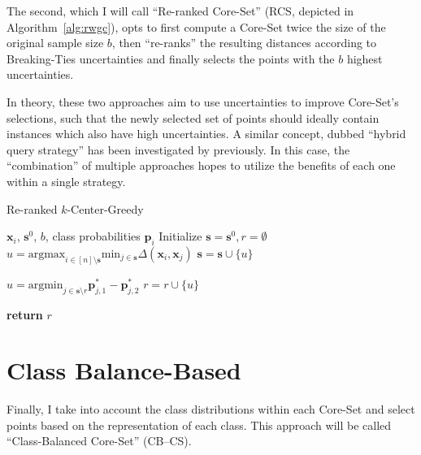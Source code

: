 \documentclass[english,bachelor,ul]{webisthesis} %
\begin{document}
The second, which I will call ``Re-ranked Core-Set'' (RCS, depicted in Algorithm~\ref{alg:rwgc}), opts to first compute a Core-Set twice the size of the original sample size $b$, then ``re-ranks'' the resulting distances according to Breaking-Ties uncertainties and finally selects the points with the $b$ highest uncertainties.

In theory, these two approaches aim to use uncertainties to improve Core-Set's selections, such that the newly selected set of points should ideally contain instances which also have high uncertainties. A similar concept, dubbed ``hybrid query strategy'' has been investigated by \cite{DBLP:journals/corr/abs-2110-03785} previously. In this case, the ``combination'' of multiple approaches hopes to utilize the benefits of each one within a single strategy.

\begin{algorithm}[htpb]
\caption{Re-ranked $k$-Center-Greedy}%
\label{alg:rwgc}
\begin{algorithmic}

\Require $ \mathbf{x}_i $, $ \mathbf{s}^0 $, $ b $, class probabilities $ \mathbf{p}_i $
\State Initialize $ \mathbf{s} = \mathbf{s}^0, r = \emptyset $
\Repeat
\State $ u = \text{argmax}_{i \in [n] \setminus \mathbf{s}} \text{min}_{j \in \mathbf{s}} \Delta(\mathbf{x}_i, \mathbf{x}_j) $
\State $ \mathbf{s} = \mathbf{s} \cup \{u\} $



\Repeat
\State $ u = \text{argmin}_{j \in \mathbf{s} \setminus r}\mathbf{p}_{j, 1}^* - \mathbf{p}_{j, 2}^* $
\State $ r = r \cup \{u\} $

\State \textbf{return} $ r $
\end{algorithmic}
\end{algorithm}

\section{Class Balance-Based}

Finally, I take into account the class distributions within each Core-Set and select points based on the representation of each class. This approach will be called ``Class-Balanced Core-Set'' (CB--CS).
\end{document}
